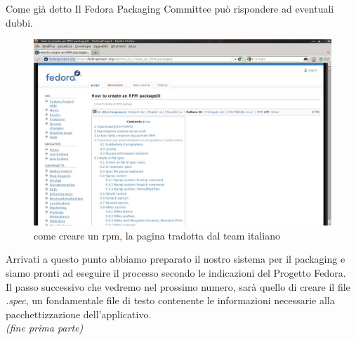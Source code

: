Come già detto Il Fedora Packaging Committee può rispondere ad eventuali dubbi.\\

\begin{figure}[!ht]
\centering
\includegraphics[scale=.21]{articoli/sistema_avanzato/immagini/rpm_wiki.jpeg}
\caption{come creare un rpm, la pagina tradotta dal team italiano}
\end{figure}

Arrivati a questo punto abbiamo preparato il nostro sistema per il packaging e siamo pronti ad eseguire il processo secondo le indicazioni del Progetto Fedora.\\

Il passo successivo che vedremo nel prossimo numero, sarà quello di creare il file {\itshape .spec}, un fondamentale file di testo contenente le informazioni necessarie alla pacchettizzazione dell'applicativo.\\


\hfill {\itshape (fine prima parte)}


